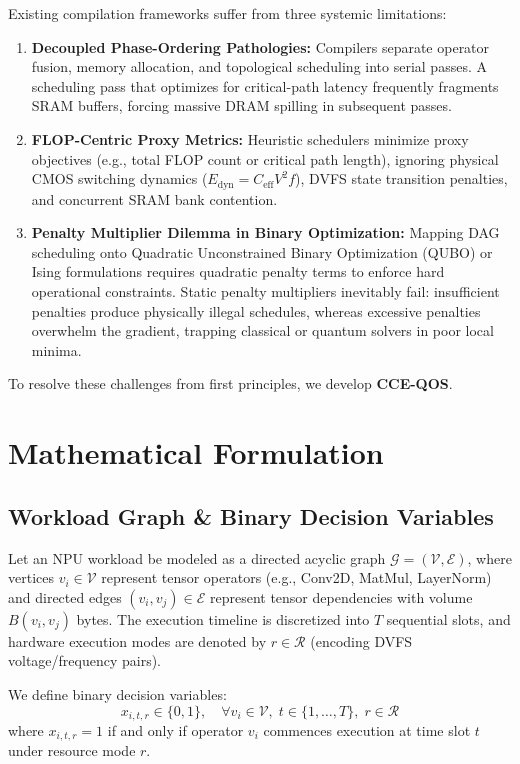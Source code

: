 \documentclass[journal]{IEEEtran}
\theoremstyle{definition}
\begin{document}
Existing compilation frameworks suffer from three systemic limitations:
\begin{enumerate}
    \item \textbf{Decoupled Phase-Ordering Pathologies:} Compilers separate operator fusion, memory allocation, and topological scheduling into serial passes. A scheduling pass that optimizes for critical-path latency frequently fragments SRAM buffers, forcing massive DRAM spilling in subsequent passes.
    \item \textbf{FLOP-Centric Proxy Metrics:} Heuristic schedulers minimize proxy objectives (e.g., total FLOP count or critical path length), ignoring physical CMOS switching dynamics ($E_{\text{dyn}} = C_{\text{eff}} V^2 f$), DVFS state transition penalties, and concurrent SRAM bank contention.
    \item \textbf{Penalty Multiplier Dilemma in Binary Optimization:} Mapping DAG scheduling onto Quadratic Unconstrained Binary Optimization (QUBO) or Ising formulations requires quadratic penalty terms to enforce hard operational constraints. Static penalty multipliers inevitably fail: insufficient penalties produce physically illegal schedules, whereas excessive penalties overwhelm the gradient, trapping classical or quantum solvers in poor local minima.
\end{enumerate}

To resolve these challenges from first principles, we develop \textbf{CCE-QOS}.

\section{Mathematical Formulation}
\subsection{Workload Graph & Binary Decision Variables}
Let an NPU workload be modeled as a directed acyclic graph $\mathcal{G} = (\mathcal{V}, \mathcal{E})$, where vertices $v_i \in \mathcal{V}$ represent tensor operators (e.g., Conv2D, MatMul, LayerNorm) and directed edges $(v_i, v_j) \in \mathcal{E}$ represent tensor dependencies with volume $B(v_i, v_j)$ bytes. The execution timeline is discretized into $T$ sequential slots, and hardware execution modes are denoted by $r \in \mathcal{R}$ (encoding DVFS voltage/frequency pairs).

We define binary decision variables:
\begin{equation}
x_{i,t,r} \in \{0, 1\}, \quad \forall v_i \in \mathcal{V}, \; t \in \{1, \dots, T\}, \; r \in \mathcal{R}
\end{equation}
where $x_{i,t,r} = 1$ if and only if operator $v_i$ commences execution at time slot $t$ under resource mode $r$.
\end{document}
